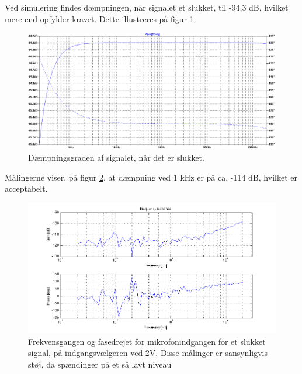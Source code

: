 Ved simulering findes dæmpningen, når signalet et slukket, til -94,3 dB, hvilket mere end opfylder kravet. Dette illustreres på figur \ref{fig:indaccept:slukketsimulering}.
\begin{figure}[h]
\centering
\includegraphics[width=\textwidth]{teknisk/indgangsvaelger/simulering/daempning_af_signal.png}
\caption{Dæmpningsgraden af signalet, når det er slukket.}
\label{fig:indaccept:slukketsimulering}
\end{figure}

Målingerne viser, på figur \ref{fig:indaccept:slukketmaaling}, at dæmpning ved 1 kHz er på ca. -114 dB, hvilket er acceptabelt.
\begin{figure}[h]
\centering
\includegraphics[width=\textwidth]{maalerapporter/indgangsvaelger/Indgangsvlger mic 2v slukket frek.png}
\caption{Frekvensgangen og fasedrejet for mikrofonindgangen for et slukket signal, på indgangsvælgeren ved 2V. Disse målinger er sansynligvis støj, da spændinger på et så lavt niveau}
\label{fig:indaccept:slukketmaaling}
\end{figure}	

